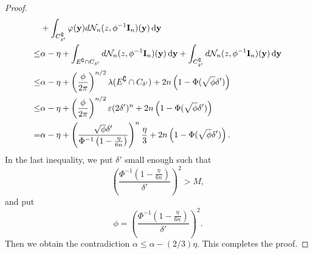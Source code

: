 \documentclass[bj]{imsart}
\newcommand{\By}{\mathbf{y}}    \newcommand{\Bz}{\mathbf{z}}
\theoremstyle{plain}
\theoremstyle{definition}
\theoremstyle{remark}
\begin{document}
\begin{proof}
\begin{equation*}
\begin{split}
            &+
            \int_{C_{\delta'}^\complement}\varphi(\By) d\mathcal N_n (z, \phi^{-1} \BI_n) (\By)\,\mathrm{d} \By
            \\
            \leq&
            \alpha-\eta
            +
            \int_{E^\complement\cap C_{\delta'}} d\mathcal N_n (z, \phi^{-1} \BI_n) (\By)\,\mathrm{d} \By
            +
            \int_{C_{\delta'}^\complement} d\mathcal N_n (z, \phi^{-1} \BI_n) (\By)\,\mathrm{d} \By
            \\
            \leq&
            \alpha-\eta
            +
            \left(\frac{\phi}{2\pi}\right)^{n/2}\lambda(E^\complement\cap C_{\delta'})
            +
            2n\left(1-\Phi(\sqrt \phi \delta')\right)
            \\
            \leq&
            \alpha-\eta
            +
            \left(\frac{\phi}{2\pi}\right)^{n/2}
            \varepsilon
            (2\delta')^n
            +
            2n\left(1-\Phi(\sqrt \phi \delta')\right)
            \\
            =&
            \alpha-\eta
            +
            \left(\frac{\sqrt{\phi} \delta'}{\Phi^{-1}\left(1-\frac{\eta}{6n}\right)}\right)^{n}
            \frac{\eta}{3}
            +
            2n\left(1-\Phi(\sqrt \phi \delta')\right).
        \end{split}
    \end{equation*}
    In the last inequality, we put $\delta'$ small enough such that
\begin{equation*}
    \left(\frac{\Phi^{-1}\left(1-\frac{\eta}{6n}\right)}{\delta'}\right)^2>M,
\end{equation*}
and put
    \begin{equation*}
        \phi = \left(\frac{\Phi^{-1}\left(1-\frac{\eta}{6n}\right)}{\delta'}\right)^2.
    \end{equation*}
    Then we obtain the contradiction $\alpha\leq \alpha-(2/3)\eta$.
    This completes the proof.

    
\end{proof}
\end{document}
